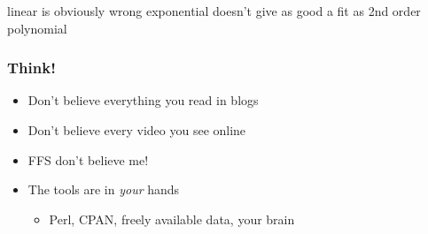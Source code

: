 \documentclass{beamer}
\begin{document}
\begin{frame}
linear is obviously wrong
exponential doesn't give as good a fit as 2nd order polynomial
\end{frame}

\begin{frame}
    \frametitle{Think!}
    \begin{itemize}
	\item Don't believe everything you read in blogs
	\item Don't believe every video you see online
	\item FFS don't believe me!
	\item The tools are in \emph{your} hands
	    \begin{itemize}
		\item Perl, CPAN, freely available data, your brain
	    \end{itemize}
    \end{itemize}
\end{frame}


\end{document}
